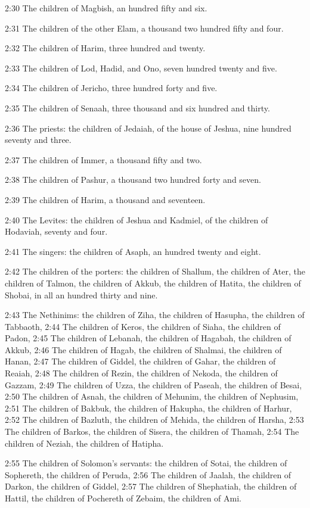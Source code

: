 2:30 The children of Magbish, an hundred fifty and six.

2:31 The children of the other Elam, a thousand two hundred fifty and
four.

2:32 The children of Harim, three hundred and twenty.

2:33 The children of Lod, Hadid, and Ono, seven hundred twenty and
five.

2:34 The children of Jericho, three hundred forty and five.

2:35 The children of Senaah, three thousand and six hundred and
thirty.

2:36 The priests: the children of Jedaiah, of the house of Jeshua,
nine hundred seventy and three.

2:37 The children of Immer, a thousand fifty and two.

2:38 The children of Pashur, a thousand two hundred forty and seven.

2:39 The children of Harim, a thousand and seventeen.

2:40 The Levites: the children of Jeshua and Kadmiel, of the children
of Hodaviah, seventy and four.

2:41 The singers: the children of Asaph, an hundred twenty and eight.

2:42 The children of the porters: the children of Shallum, the
children of Ater, the children of Talmon, the children of Akkub, the
children of Hatita, the children of Shobai, in all an hundred thirty
and nine.

2:43 The Nethinims: the children of Ziha, the children of Hasupha, the
children of Tabbaoth, 2:44 The children of Keros, the children of
Siaha, the children of Padon, 2:45 The children of Lebanah, the
children of Hagabah, the children of Akkub, 2:46 The children of
Hagab, the children of Shalmai, the children of Hanan, 2:47 The
children of Giddel, the children of Gahar, the children of Reaiah,
2:48 The children of Rezin, the children of Nekoda, the children of
Gazzam, 2:49 The children of Uzza, the children of Paseah, the
children of Besai, 2:50 The children of Asnah, the children of
Mehunim, the children of Nephusim, 2:51 The children of Bakbuk, the
children of Hakupha, the children of Harhur, 2:52 The children of
Bazluth, the children of Mehida, the children of Harsha, 2:53 The
children of Barkos, the children of Sisera, the children of Thamah,
2:54 The children of Neziah, the children of Hatipha.

2:55 The children of Solomon's servants: the children of Sotai, the
children of Sophereth, the children of Peruda, 2:56 The children of
Jaalah, the children of Darkon, the children of Giddel, 2:57 The
children of Shephatiah, the children of Hattil, the children of
Pochereth of Zebaim, the children of Ami.

